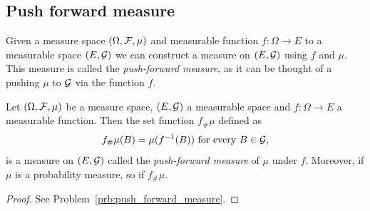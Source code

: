 %
%




\subsection{Push forward measure}

Given a measure space $(\Omega, \mathcal F, \mu)$ and measurable function $f : \Omega \to E$ to a measurable space $(E,\mathcal G)$ we can construct a measure on $(E,\mathcal G)$ using $f$ and $\mu$. This measure is called the \emph{push-forward measure}, as it can be thought of a pushing $\mu$ to $\mathcal G$ via the function $f$.

\begin{proposition}\label{prop:push_forward_measure}
Let $(\Omega, \mathcal F, \mu)$ be a measure space, $(E, \mathcal G)$ a measurable space and $f : \Omega \to E$ a measurable function. Then the set function $f_\# \mu$ defined as
\[
	f_\# \mu (B) = \mu(f^{-1}(B)) \text{ for every } B \in \mathcal G,
\]
is a measure on $(E, \mathcal G)$ called the \emph{push-forward measure} of $\mu$ under $f$. Moreover, if $\mu$ is a probability measure, so if $f_\# \mu$.
\end{proposition}

\begin{proof}
See Problem~\ref{prb:push_forward_measure}.
\end{proof} 


